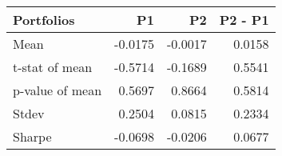 \begin{tabular}{lrrr}
\toprule
Portfolios & P1 & P2 & P2 - P1 \\
\midrule
Mean & -0.0175 & -0.0017 & 0.0158 \\
t-stat of mean & -0.5714 & -0.1689 & 0.5541 \\
p-value of mean & 0.5697 & 0.8664 & 0.5814 \\
Stdev & 0.2504 & 0.0815 & 0.2334 \\
Sharpe & -0.0698 & -0.0206 & 0.0677 \\
\bottomrule
\end{tabular}
